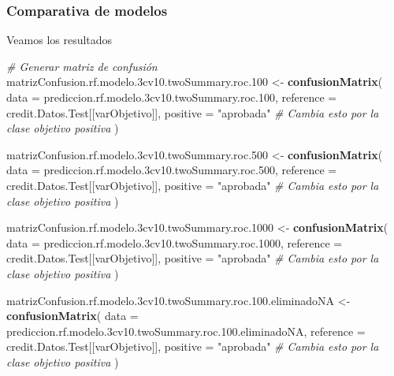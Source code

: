 \documentclass[
]{article}
\newenvironment{Shaded}{\begin{snugshade}}{\end{snugshade}}
\newcommand{\AttributeTok}[1]{\textcolor[rgb]{0.13,0.29,0.53}{#1}}
\newcommand{\CommentTok}[1]{\textcolor[rgb]{0.56,0.35,0.01}{\textit{#1}}}
\newcommand{\FloatTok}[1]{\textcolor[rgb]{0.00,0.00,0.81}{#1}}
\newcommand{\FunctionTok}[1]{\textcolor[rgb]{0.13,0.29,0.53}{\textbf{#1}}}
\newcommand{\NormalTok}[1]{#1}
\newcommand{\OtherTok}[1]{\textcolor[rgb]{0.56,0.35,0.01}{#1}}
\newcommand{\StringTok}[1]{\textcolor[rgb]{0.31,0.60,0.02}{#1}}
\begin{document}
\hypertarget{comparativa-de-modelos}{%
\subsubsection{Comparativa de modelos}\label{comparativa-de-modelos}}

Veamos los resultados

\begin{Shaded}
\begin{Highlighting}[]
\CommentTok{\# Generar matriz de confusión}
\NormalTok{matrizConfusion.rf.modelo}\FloatTok{.3}\NormalTok{cv10.twoSummary.roc}\FloatTok{.100} \OtherTok{\textless{}{-}} \FunctionTok{confusionMatrix}\NormalTok{(}
  \AttributeTok{data =}\NormalTok{ prediccion.rf.modelo}\FloatTok{.3}\NormalTok{cv10.twoSummary.roc}\FloatTok{.100}\NormalTok{,}
  \AttributeTok{reference =}\NormalTok{ credit.Datos.Test[[varObjetivo]],}
  \AttributeTok{positive =} \StringTok{"aprobada"} \CommentTok{\# Cambia esto por la clase objetivo positiva}
\NormalTok{)}

\NormalTok{matrizConfusion.rf.modelo}\FloatTok{.3}\NormalTok{cv10.twoSummary.roc}\FloatTok{.500} \OtherTok{\textless{}{-}} \FunctionTok{confusionMatrix}\NormalTok{(}
  \AttributeTok{data =}\NormalTok{ prediccion.rf.modelo}\FloatTok{.3}\NormalTok{cv10.twoSummary.roc}\FloatTok{.500}\NormalTok{,}
  \AttributeTok{reference =}\NormalTok{ credit.Datos.Test[[varObjetivo]],}
  \AttributeTok{positive =} \StringTok{"aprobada"} \CommentTok{\# Cambia esto por la clase objetivo positiva}
\NormalTok{)}

\NormalTok{matrizConfusion.rf.modelo}\FloatTok{.3}\NormalTok{cv10.twoSummary.roc}\FloatTok{.1000} \OtherTok{\textless{}{-}} \FunctionTok{confusionMatrix}\NormalTok{(}
  \AttributeTok{data =}\NormalTok{ prediccion.rf.modelo}\FloatTok{.3}\NormalTok{cv10.twoSummary.roc}\FloatTok{.1000}\NormalTok{,}
  \AttributeTok{reference =}\NormalTok{ credit.Datos.Test[[varObjetivo]],}
  \AttributeTok{positive =} \StringTok{"aprobada"} \CommentTok{\# Cambia esto por la clase objetivo positiva}
\NormalTok{)}

\NormalTok{matrizConfusion.rf.modelo}\FloatTok{.3}\NormalTok{cv10.twoSummary.roc.}\FloatTok{100.}\NormalTok{eliminadoNA }\OtherTok{\textless{}{-}} \FunctionTok{confusionMatrix}\NormalTok{(}
  \AttributeTok{data =}\NormalTok{ prediccion.rf.modelo}\FloatTok{.3}\NormalTok{cv10.twoSummary.roc.}\FloatTok{100.}\NormalTok{eliminadoNA,}
  \AttributeTok{reference =}\NormalTok{ credit.Datos.Test[[varObjetivo]],}
  \AttributeTok{positive =} \StringTok{"aprobada"} \CommentTok{\# Cambia esto por la clase objetivo positiva}
\NormalTok{)}


\end{Highlighting}
\end{Shaded}
\end{document}
